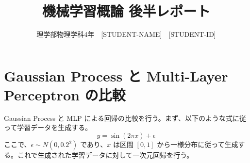 \documentclass[11pt,a4paper,dvipdfmx]{article}
\numberwithin{equation}{section}
\newenvironment{note}[0]
{
    \begin{tcolorbox}[sharp corners, colframe=gray!20, colback=gray!20, width=\textwidth]
}
{
    \end{tcolorbox}
}
\begin{document}
\title{機械学習概論 後半レポート}
\author{理学部物理学科4年　[STUDENT-NAME]　[STUDENT-ID]}
\date{}
\maketitle


\section{Gaussian Process と Multi-Layer Perceptron の比較}
\begin{note}
Gaussian Process と MLP による回帰の比較を行う。まず、以下のような式に従って学習データを生成する。
\[ y = \sin (2\pi x) + \epsilon \]
ここで、$\epsilon \sim N (0, 0.2^2)$ であり、$x$ は区間 $[0, 1]$ から一様分布に従って生成する。これで生成された学習データに対して一次元回帰を行う。
\end{note}
\end{document}
